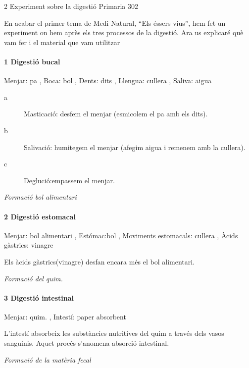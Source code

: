 \begin{news}
{2} %
{Experiment sobre la digestió}
{}
{Primaria}
{302}

En acabar el primer tema de Medi Natural, “Els éssers vius”, hem fet un experiment on hem après els tres processos de la digestió. Ara us explicaré què vam fer i el  material que vam utilitzar
\paragraph{ 1 Digestió bucal}

		Menjar: pa , Boca: bol , Dents: dits ,  Llengua: cullera , Saliva: aigua

	\begin{description}
	\item[a] Masticació: desfem el menjar (esmicolem el pa amb els dits).
	\item[b] Salivació: humitegem el menjar (afegim aigua i remenem amb la cullera).
	\item[c] Deglució:empassem el menjar.
	\end{description}

\emph{Formació bol alimentari}


\paragraph{ 2 Digestió estomacal}

        Menjar: bol alimentari , Estómac:bol , Moviments estomacals: cullera , 
             Àcids gàstrics: vinagre

	Els àcids gàstrics(vinagre) desfan encara més el bol alimentari.

	\emph{Formació del quim.}



\paragraph{ 3 Digestió intestinal}

		Menjar: quim. ,  Intestí: paper absorbent

L’intestí absorbeix les substàncies nutritives del quim a través dels vasos sanguinis. Aquet procés s’anomena absorció intestinal.

	\emph{Formació de la matèria fecal}

\end{news}
